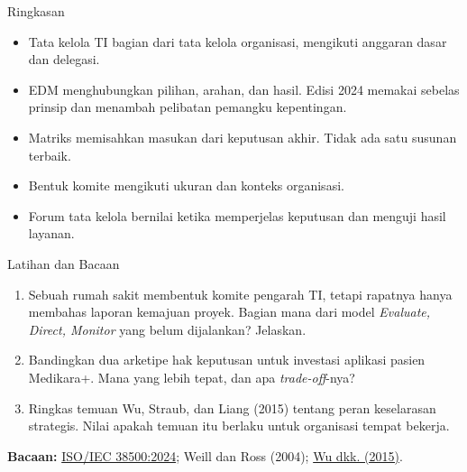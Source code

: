 \documentclass[aspectratio=169, table, 12pt]{beamer}
\begin{document}
\begin{frame}{{\Large Ringkasan}}
  \vspace{4pt}
  \small
  \begin{itemize}
    \item Tata kelola TI bagian dari tata kelola organisasi, mengikuti anggaran dasar dan delegasi.
    \item EDM menghubungkan pilihan, arahan, dan hasil. Edisi 2024 memakai sebelas prinsip dan menambah
          pelibatan pemangku kepentingan.
    \item Matriks memisahkan masukan dari keputusan akhir. Tidak ada satu susunan terbaik.
    \item Bentuk komite mengikuti ukuran dan konteks organisasi.
    \item Forum tata kelola bernilai ketika memperjelas keputusan dan menguji hasil layanan.
  \end{itemize}
\end{frame}

\begin{frame}{{\Large Latihan dan Bacaan}}
  \vspace{2pt}
  \footnotesize
  \begin{enumerate}
    \item Sebuah rumah sakit membentuk komite pengarah TI, tetapi rapatnya hanya membahas laporan
          kemajuan proyek. Bagian mana dari model \textit{Evaluate, Direct, Monitor} yang belum dijalankan?
          Jelaskan.
    \item Bandingkan dua arketipe hak keputusan untuk investasi aplikasi pasien Medikara+. Mana yang lebih
          tepat, dan apa \textit{trade-off}-nya?
    \item Ringkas temuan Wu, Straub, dan Liang (2015) tentang peran keselarasan strategis. Nilai apakah
          temuan itu berlaku untuk organisasi tempat bekerja.
  \end{enumerate}
  \vspace{4pt}
  \textbf{Bacaan:} \href{https://www.iso.org/standard/81684.html}{ISO/IEC 38500:2024};
  Weill dan Ross (2004); \href{https://aisel.aisnet.org/misq/vol39/iss2/12/}{Wu dkk. (2015)}.
\end{frame}
\end{document}
